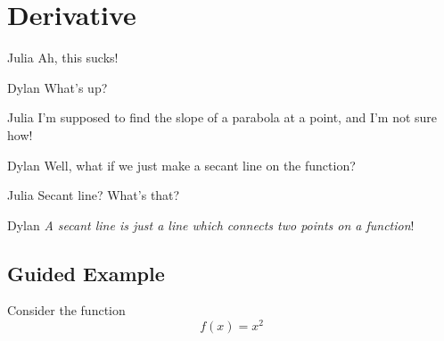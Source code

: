 \documentclass{ximera}
\begin{document}
\section{Derivative}
\begin{dialogue}
\item[Julia] Ah, this sucks!
\item[Dylan] What's up?
\item[Julia] I'm supposed to find the slope of a parabola at a point, and I'm not sure how!
\item[Dylan] Well, what if we just make a secant line on the function?
\item[Julia] Secant line? What's that?
\item[Dylan] \textit{A secant line is just a line which connects two points on a function}!
\end{dialogue}

\subsection{Guided Example}

Consider the function $$f(x) = x^2$$
\end{document}
